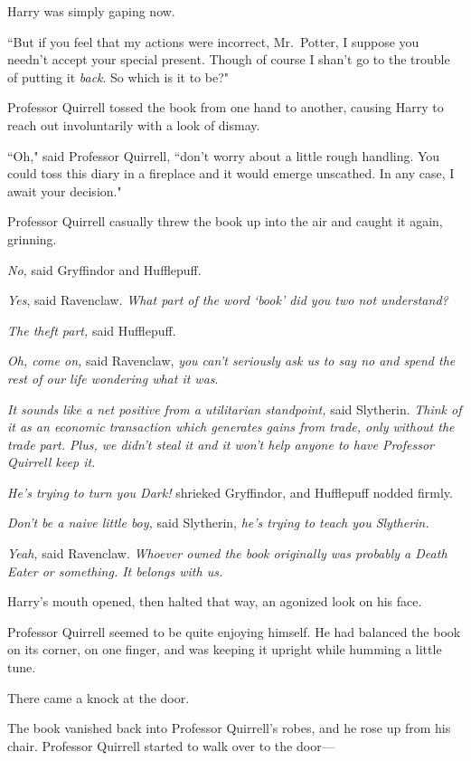 Harry was simply gaping now.

``But if you feel that my actions were incorrect, Mr.~Potter, I suppose you needn't accept your special present. Though of course I shan't go to the trouble of putting it \emph{back}. So which is it to be?"

Professor Quirrell tossed the book from one hand to another, causing Harry to reach out involuntarily with a look of dismay.

``Oh," said Professor Quirrell, ``don't worry about a little rough handling. You could toss this diary in a fireplace and it would emerge unscathed. In any case, I await your decision."

Professor Quirrell casually threw the book up into the air and caught it again, grinning.

\emph{No,} said Gryffindor and Hufflepuff.

\emph{Yes}, said Ravenclaw. \emph{What part of the word `book' did you two not understand?}

\emph{The theft part,} said Hufflepuff.

\emph{Oh, come on,} said Ravenclaw, \emph{you can't seriously ask us to say no and spend the rest of our life wondering what it was}.

\emph{It sounds like a net positive from a utilitarian standpoint,} said Slytherin. \emph{Think of it as an economic transaction which generates gains from trade, only without the trade part. Plus, \emph{we} didn't steal it and it won't help anyone to have Professor Quirrell keep it.}

\emph{He's trying to turn you Dark!} shrieked Gryffindor, and Hufflepuff nodded firmly.

\emph{Don't be a naive little boy,} said Slytherin, \emph{he's trying to teach you Slytherin.}

\emph{Yeah,} said Ravenclaw. \emph{Whoever owned the book originally was probably a Death Eater or something. It belongs with us.}

Harry's mouth opened, then halted that way, an agonized look on his face.

Professor Quirrell seemed to be quite enjoying himself. He had balanced the book on its corner, on one finger, and was keeping it upright while humming a little tune.

There came a knock at the door.

The book vanished back into Professor Quirrell's robes, and he rose up from his chair. Professor Quirrell started to walk over to the door—

